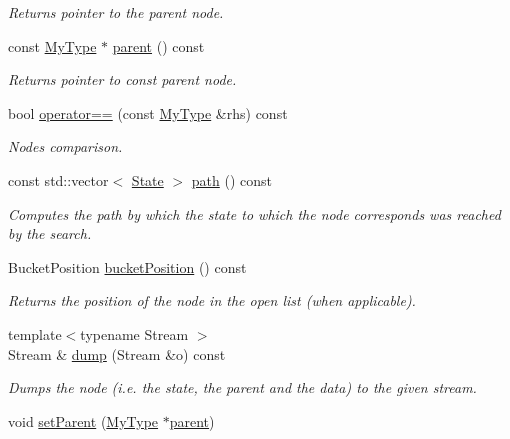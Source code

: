 \begin{DoxyCompactItemize}
\begin{DoxyCompactList}\small\item\em Returns pointer to the parent node. \end{DoxyCompactList}\item 
const \hyperlink{structSearchNode_ad78b2656f529b6dd04b58957267cfed8}{My\+Type} $\ast$ \hyperlink{structSearchNode_a604a7f7114ed29911ef93b6768bff1c3}{parent} () const 
\begin{DoxyCompactList}\small\item\em Returns pointer to const parent node. \end{DoxyCompactList}\item 
bool \hyperlink{structSearchNode_a3b923aa84992ff46e821c4a440f65edf}{operator==} (const \hyperlink{structSearchNode_ad78b2656f529b6dd04b58957267cfed8}{My\+Type} \&rhs) const 
\begin{DoxyCompactList}\small\item\em Nodes comparison. \end{DoxyCompactList}\item 
const std\+::vector$<$ \hyperlink{structSearchNode_a2dcd6df22e4aa33cb18ef2fb6bd626c4}{State} $>$ \hyperlink{structSearchNode_abf680b5d7116d82100cd4b47208756a4}{path} () const 
\begin{DoxyCompactList}\small\item\em Computes the path by which the state to which the node corresponds was reached by the search. \end{DoxyCompactList}\item 
Bucket\+Position \hyperlink{structSearchNode_a01515f2f078e543f47134d65a55f004d}{bucket\+Position} () const 
\begin{DoxyCompactList}\small\item\em Returns the position of the node in the open list (when applicable). \end{DoxyCompactList}\item 
{\footnotesize template$<$typename Stream $>$ }\\Stream \& \hyperlink{structSearchNode_a5d939786077bedd5076886309fdeeeb9}{dump} (Stream \&o) const 
\begin{DoxyCompactList}\small\item\em Dumps the node (i.\+e. the state, the parent and the data) to the given stream. \end{DoxyCompactList}\item 
void \hyperlink{structSearchNode_accefe7d41f17feef2d39aa5ccdf8cb9b}{set\+Parent} (\hyperlink{structSearchNode_ad78b2656f529b6dd04b58957267cfed8}{My\+Type} $\ast$\hyperlink{structSearchNode_a483e49311935b2a9897715c5bd3f89d7}{parent})

\end{DoxyCompactItemize}

